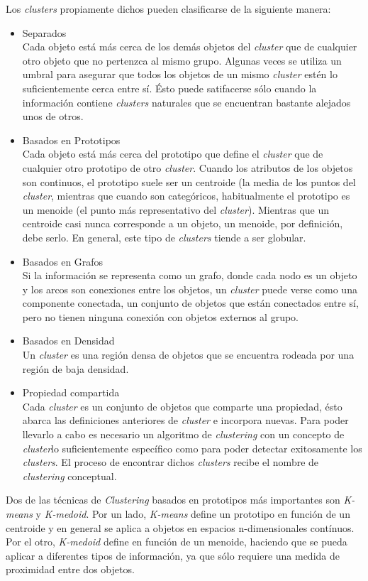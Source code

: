 Los \textit{clusters} propiamente dichos pueden clasificarse de la siguiente manera:

\begin{itemize}
 \item Separados \\
 Cada objeto está más cerca de los demás objetos del \textit{cluster} que de cualquier otro objeto que no pertenzca
 al mismo grupo. Algunas veces se utiliza un umbral para asegurar que todos los  objetos de un mismo \textit{cluster}
 estén lo suficientemente cerca entre sí. Ésto puede satifacerse sólo cuando la información contiene \textit{clusters}
 naturales que se encuentran bastante alejados unos de otros.
 \item Basados en Prototipos \\
 Cada objeto está más cerca del prototipo que define el \textit{cluster} que de cualquier otro prototipo de otro
 \textit{cluster}. Cuando los atributos de los objetos son continuos, el prototipo suele ser un centroide (la media de
 los puntos del \textit{cluster}, mientras que cuando son categóricos, habitualmente el prototipo es un menoide
 (el punto más representativo del \textit{cluster}). Mientras que un centroide casi nunca corresponde a un objeto, un
 menoide, por definición, debe serlo. En general, este tipo de \textit{clusters} tiende a ser globular.
 \item Basados en Grafos \\
 Si la información se representa como un grafo, donde cada nodo es un objeto y los arcos son conexiones entre los
 objetos, un \textit{cluster} puede verse como una componente conectada, un conjunto de objetos que están conectados
 entre sí, pero no tienen ninguna conexión con objetos externos al grupo.
 \item Basados en Densidad \\
 Un \textit{cluster} es una región densa de objetos que se encuentra rodeada por una región de baja densidad.
 \item Propiedad compartida \\
 Cada \textit{cluster} es un conjunto de objetos que comparte una propiedad, ésto abarca las definiciones anteriores
 de \textit{cluster} e incorpora nuevas. Para poder llevarlo a cabo es necesario un algoritmo de \textit{clustering}
 con un concepto de \textit{cluster}lo suficientemente específico como para poder detectar exitosamente los
 \textit{clusters}. El proceso de encontrar dichos \textit{clusters} recibe el nombre de \textit{clustering} conceptual.
\end{itemize}

Dos de las técnicas de \textit{Clustering} basados en prototipos más importantes son \textit{K-means} y \textit{K-medoid}.
Por un lado, \textit{K-means} define un prototipo en función de un centroide y en general se aplica a objetos en
espacios n-dimensionales contínuos. Por el otro, \textit{K-medoid} define en función de un menoide, haciendo que se
pueda aplicar a diferentes tipos de información, ya que sólo requiere una medida de proximidad entre dos objetos.
